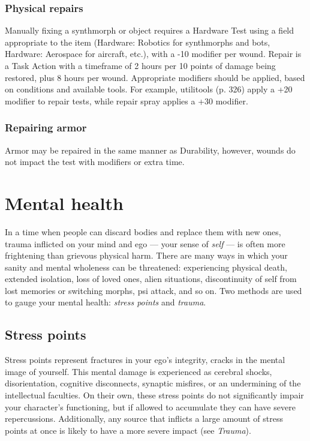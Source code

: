 \subsubsection{Physical repairs} 

Manually fixing a synthmorph or object requires a Hardware Test using a field appropriate to the item (Hardware: Robotics for synthmorphs and bots, Hardware: Aerospace for aircraft, etc.), with a -10 modifier per wound. Repair is a Task Action with a timeframe of 2 hours per 10 points of damage being restored, plus 8 hours per wound. Appropriate modifiers should be applied, based on conditions and available tools. For example, utilitools (p. 326) apply a +20 modifier to repair tests, while repair spray applies a +30 modifier. 

\subsubsection{Repairing armor} 

Armor may be repaired in the same manner as Durability, however, wounds do not impact the test with modifiers or extra time. 

\section{Mental health} \label{sec:mental-health} 

In a time when people can discard bodies and replace them with new ones, trauma inflicted on your mind and ego --- your sense of \emph{self} --- is often more frightening than grievous physical harm. There are many ways in which your sanity and mental wholeness can be threatened: experiencing physical death, extended isolation, loss of loved ones, alien situations, discontinuity of self from lost memories or switching morphs, psi attack, and so on. Two methods are used to gauge your mental health: \emph{stress points} and \emph{trauma}. 



\subsection{Stress points} \label{sec:stress-points} 

Stress points represent fractures in your ego’s integrity, cracks in the mental image of yourself. This mental damage is experienced as cerebral shocks, disorientation, cognitive disconnects, synaptic misfires, or an undermining of the intellectual faculties. On their own, these stress points do not significantly impair your character’s functioning, but if allowed to accumulate they can have severe repercussions. Additionally, any source that inflicts a large amount of stress points at once is likely to have a more severe impact (see \emph{Trauma}). 

